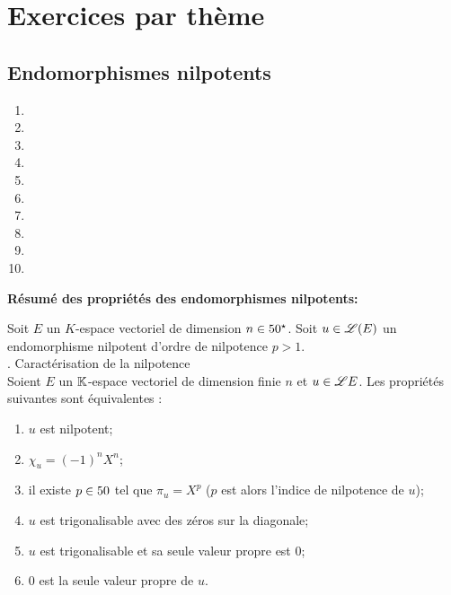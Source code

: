 \documentclass[
	a4paper, %
	fontsize=11pt, %
	twoside=true, %
	chapterentrydots=true, %
	numbers=noenddot, %
]{kaobook}
\begin{document}
\chapter{Exercices par thème}
\section{Endomorphismes nilpotents}
\begin{enumerate}
    \item {}
    \item {}
    \item {}
    \item {}
    \item {}
    \item {}
    \item {}
    \item {}
    \item {}
    \item {}
\end{enumerate}

\textbf{Résumé des propriétés des endomorphismes nilpotents:}

Soit $E$ un $K$-espace vectoriel de dimension $n \in 50^\star$. Soit $u \in \mathscr{L}(E)$ un endomorphisme nilpotent d'ordre de nilpotence $p > 1$. \\
\cite{objectif_agregation}. Caractérisation de la nilpotence \\
Soient $E$ un $\mathbb{K}$-espace vectoriel de dimension finie $n$ et $u \in \mathscr{L}{E}$. Les propriétés suivantes sont équivalentes :
\begin{enumerate}[label=(\roman*)]
    \item $u$ est nilpotent;
    \item $\chi_u = (-1)^n X^n$;
    \item il existe $p \in 50$ tel que $\pi_u = X^p$ ($p$ est alors l'indice de nilpotence de $u$);
    \item $u$ est trigonalisable avec des zéros sur la diagonale;
    \item $u$ est trigonalisable et sa seule valeur propre est $0$;
    \item $0$ est la seule valeur propre de $u$.
\end{enumerate}
\end{document}

